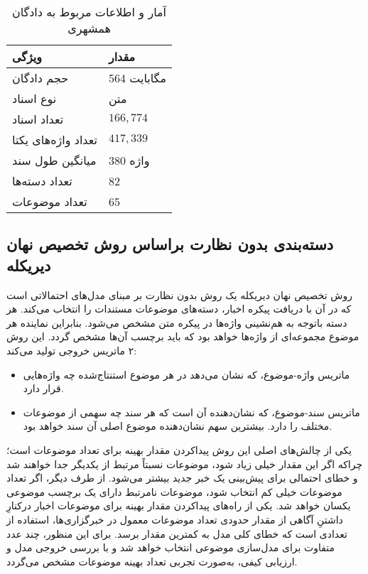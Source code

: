 \begin{table} [h!]
	\caption{آمار و اطلاعات مربوط به دادگان همشهری}
	\label{table.hamshahri}
	\begin{center}
		\begin{tabular}{|M{6cm}|M{4cm}|}
			\hline
				ویژگی & مقدار \\
			\hline
			\hline
			حجم دادگان & 564 مگابایت \\ \hline
			نوع اسناد & متن \\ \hline
			تعداد اسناد & $166,774$ \\ \hline
			تعداد واژه‌های یکتا & $417,339$ \\ \hline
			میانگین طول سند & 380 واژه \\ \hline
			تعداد دسته‌ها & 82 \\ \hline
			تعداد موضوعات & 65 \\ \hline
		\end{tabular}
	\end{center}
\end{table}

\subsection{دسته‌بندی بدون‌ نظارت براساس روش تخصیص نهان دیریکله}
\label{section.lda_classification}
روش تخصیص نهان دیریکله \citep{blei2003latent} یک روش بدون‌ نظارت بر مبنای مدل‌های احتمالاتی است که در آن با دریافت  پیکره  اخبار، دسته‌های موضوعات مستندات را انتخاب می‌کند. هر دسته باتوجه ‌به هم‌نشینی واژه‌ها در پیکره متن مشخص می‌شود. بنابراین نماینده هر موضوع مجموعه‌ای از واژه‌ها خواهد بود که باید برچسب آن‌ها مشخص گردد. این روش  ۲ ماتریس خروجی تولید می‌کند:
\begin{itemize}
	\item
ماتریس واژه-موضوع، که نشان می‌دهد در هر موضوع استنتاج‌شده چه واژه‌هایی قرار دارد.
	\item
ماتریس سند-موضوع، که نشان‌دهنده آن است که هر سند چه سهمی از موضوعات مختلف را دارد. بیشترین سهم نشان‌دهنده موضوع اصلی آن سند خواهد بود.
\end{itemize}
یکی از چالش‌های اصلی این روش پیداکردن مقدار بهینه برای تعداد موضوعات است؛ چراکه اگر این مقدار خیلی زیاد شود، موضوعات نسبتاً مرتبط از یکدیگر جدا خواهند شد و خطای احتمالی برای پیش‌بینی یک خبر جدید بیشتر می‌شود. از طرف دیگر، اگر تعداد موضوعات خیلی کم انتخاب شود، موضوعات نامرتبط دارای یک برچسب موضوعی یکسان خواهد شد. یکی از راه‌های پیداکردن مقدار بهینه برای موضوعات اخبار درکنارِ داشتنِ آگاهی از مقدار حدودی تعداد موضوعات معمول در خبرگزاری‌ها، استفاده از تعدادی است که خطای کلی مدل به کمترین مقدار برسد. برای این منظور، چند عدد متفاوت برای مدل‌سازی موضوعی انتخاب خواهد شد و با بررسی خروجی مدل و ارزیابی کیفی، به‌صورت تجربی تعداد بهینه موضوعات مشخص می‌گردد.

